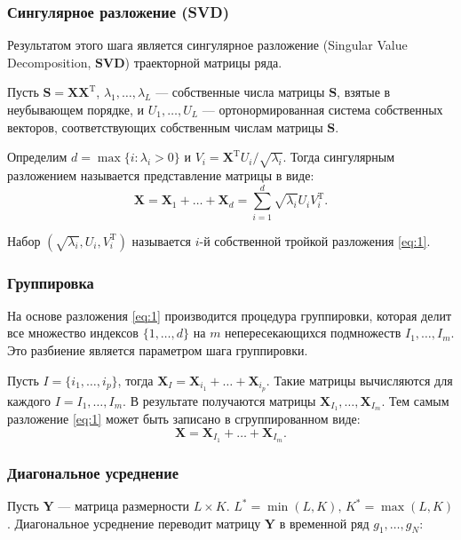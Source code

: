 \documentclass[a4paper, 11pt]{article}
\begin{document}
\subsubsection{Сингулярное разложение (SVD)}
Результатом этого шага является сингулярное разложение (Singular Value Decomposition, $\mathbf{SVD}$) траекторной матрицы ряда.

Пусть $\mathbf{S} = \mathbf{X}\mathbf{X}^{\mathrm{T}}$, 
$\lambda_1, \dots, \lambda_L$ --- собственные числа матрицы $\mathbf{S}$, взятые в неубывающем порядке, и
$U_1, \dots, U_L$ --- ортонормированная система собственных векторов, соответствующих собственным числам матрицы $\mathbf S$. 

Определим $d = \max{ \{i: \lambda_i > 0 \}}$ и 
$V_i = \mathbf{X}^{\mathrm{T}} U_i / \sqrt{\lambda_i}$.
Тогда сингулярным разложением называется представление матрицы в виде:
\begin{equation}
	\mathbf{X} = \mathbf{X}_1 + \dots + \mathbf{X}_d =
	\sum_{i = 1}^{d} \sqrt{\lambda_i} U_i V_{i}^{\mathrm{T}}\label{eq:1}.
\end{equation}

Набор $( \sqrt{\lambda_i}, U_i, V_{i}^{\mathrm{T}})$ называется $i$-й собственной тройкой разложения \eqref{eq:1}.

\subsubsection{Группировка}
На основе разложения \eqref{eq:1} производится процедура группировки, которая делит все множество индексов $\{1, \dots, d\}$ на $m$ непересекающихся подмножеств $I_1, \dots, I_m$. Это разбиение является параметром шага группировки.

Пусть $I = \{i_1, \dots, i_p\}$, тогда $\mathbf{X}_I =
\mathbf{X}_{i_1} + \dots + \mathbf{X}_{i_p}$. Такие матрицы вычисляются для каждого $I = I_1, \dots, I_m$. 
В результате получаются матрицы $\mathbf{X}_{I_1}, \dots, \mathbf{X}_{I_m}$. Тем самым разложение \eqref{eq:1} может быть записано в сгруппированном виде:
\begin{equation*}
	\mathbf{X} = \mathbf{X}_{I_1} + \dots + \mathbf{X}_{I_m}.
\end{equation*}

\subsubsection{Диагональное усреднение}
Пусть $\mathbf{Y}$ --- матрица размерности $L \times K$. $L^* = \min(L, K), \, K^* = \max(L,K)$. Диагональное усреднение переводит матрицу $\mathbf{Y}$ в временной ряд $g_1, \dots, g_{N} $:
\end{document}
